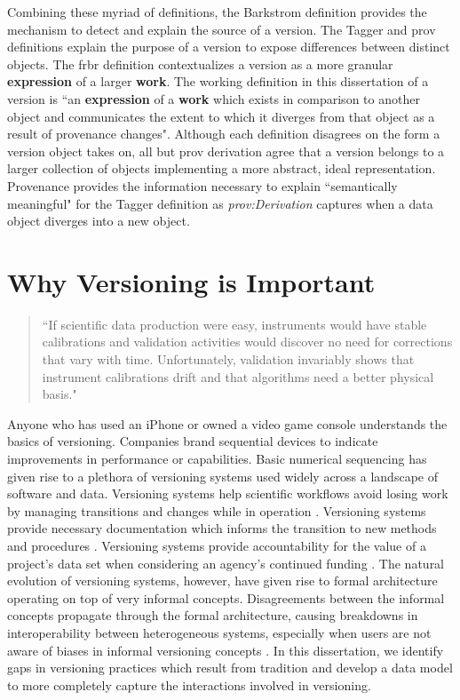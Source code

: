 Combining these myriad of definitions, the Barkstrom definition provides the mechanism to detect and explain the source of a version.
The Tagger and \gls{prov} definitions explain the purpose of a version to expose differences between distinct objects.
The \gls{frbr} definition contextualizes a version as a more granular \textbf{expression} of a larger \textbf{work}.
The working definition in this dissertation of a \gls{version} is ``an \textbf{expression} of a \textbf{work} which exists in comparison to another object and communicates the extent to which it diverges from that object as a result of provenance changes".
Although each definition disagrees on the form a version object takes on, all but \gls{prov} derivation agree that a version belongs to a larger collection of objects implementing a more abstract, ideal representation.
Provenance provides the information necessary to explain ``semantically meaningful" for the Tagger definition as \textit{prov:Derivation} captures when a data object diverges into a new object.

\section{Why Versioning is Important}

\begin{quotation}
	``If scientific data production were easy, instruments would
	have stable calibrations and validation activities would discover no need for
	corrections that vary with time. Unfortunately, validation invariably shows that
	instrument calibrations drift and that algorithms need a better physical basis." \cite{Barkstrom2003}
\end{quotation}

Anyone who has used an iPhone or owned a video game console understands the basics of versioning.
Companies brand sequential devices to indicate improvements in performance or capabilities.
Basic numerical sequencing has given rise to a plethora of versioning systems used widely across a landscape of software and data.
Versioning systems help scientific workflows avoid losing work by managing transitions and changes while in operation \cite{Casati1996}.
Versioning systems provide necessary documentation which informs the transition to new methods and procedures \cite{Wiil:2000:RDH:338407.338517}.
Versioning systems provide accountability for the value of a project's data set when considering an agency's continued funding \cite{Cavanaugh2002}.
The natural evolution of versioning systems, however, have given rise to formal architecture operating on top of very informal concepts.
Disagreements between the informal concepts propagate through the formal architecture, causing breakdowns in interoperability between heterogeneous systems, especially when users are not aware of biases in informal versioning concepts \cite{Baker2009}.
In this dissertation, we identify gaps in versioning practices which result from tradition and develop a data model to more completely capture the interactions involved in versioning.

